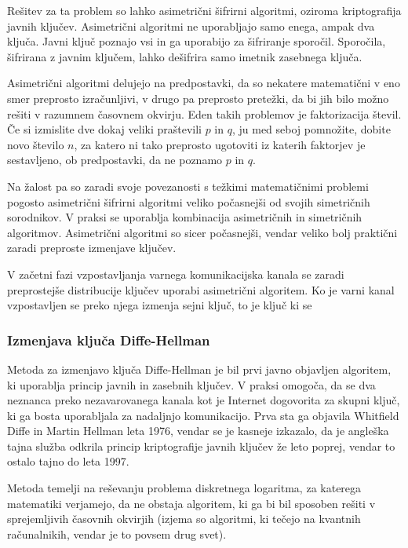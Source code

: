 \documentclass[12pt,a4paper,openany]{book}
\begin{document}
Rešitev za ta problem so lahko asimetrični šifrirni algoritmi, oziroma kriptografija javnih ključev. Asimetrični algoritmi ne uporabljajo samo enega, ampak dva ključa. Javni ključ poznajo vsi in ga uporabijo za šifriranje sporočil. Sporočila, šifrirana z javnim ključem, lahko dešifrira samo imetnik zasebnega ključa.

Asimetrični algoritmi delujejo na predpostavki, da so nekatere matematični v eno smer preprosto izračunljivi, v drugo pa preprosto pretežki, da bi jih bilo možno rešiti v razumnem časovnem okvirju. Eden takih problemov je faktorizacija števil. Če si izmislite dve dokaj veliki praštevili $p$ in $q$, ju med seboj pomnožite, dobite novo število $n$, za katero ni tako preprosto ugotoviti iz katerih faktorjev je sestavljeno, ob predpostavki, da ne poznamo $p$ in $q$.

Na žalost pa so zaradi svoje povezanosti s težkimi matematičnimi problemi pogosto asimetrični šifrirni algoritmi veliko počasnejši od svojih simetričnih sorodnikov. V praksi se uporablja kombinacija asimetričnih in simetričnih algoritmov. Asimetrični algoritmi so sicer počasnejši, vendar veliko bolj praktični zaradi preproste izmenjave ključev.


V začetni fazi vzpostavljanja varnega komunikacijska kanala se zaradi preprostejše distribucije ključev uporabi asimetrični algoritem. Ko je varni kanal vzpostavljen se preko njega izmenja sejni ključ, to je ključ ki se

\subsubsection{Izmenjava ključa Diffe-Hellman}

Metoda za izmenjavo ključa Diffe-Hellman je bil prvi javno objavljen algoritem, ki uporablja princip javnih in zasebnih ključev. V praksi omogoča, da se dva neznanca preko nezavarovanega kanala kot je Internet dogovorita za skupni ključ, ki ga bosta uporabljala za nadaljnjo komunikacijo. Prva sta ga objavila Whitfield Diffe in Martin Hellman leta 1976, vendar se je kasneje izkazalo, da je angleška tajna služba odkrila princip kriptografije javnih ključev že leto poprej, vendar to ostalo tajno do leta 1997.

Metoda temelji na reševanju problema diskretnega logaritma, za katerega matematiki verjamejo, da ne obstaja algoritem, ki ga bi bil sposoben rešiti v sprejemljivih časovnih okvirjih (izjema so algoritmi, ki tečejo na kvantnih računalnikih, vendar je to povsem drug svet).
\end{document}
